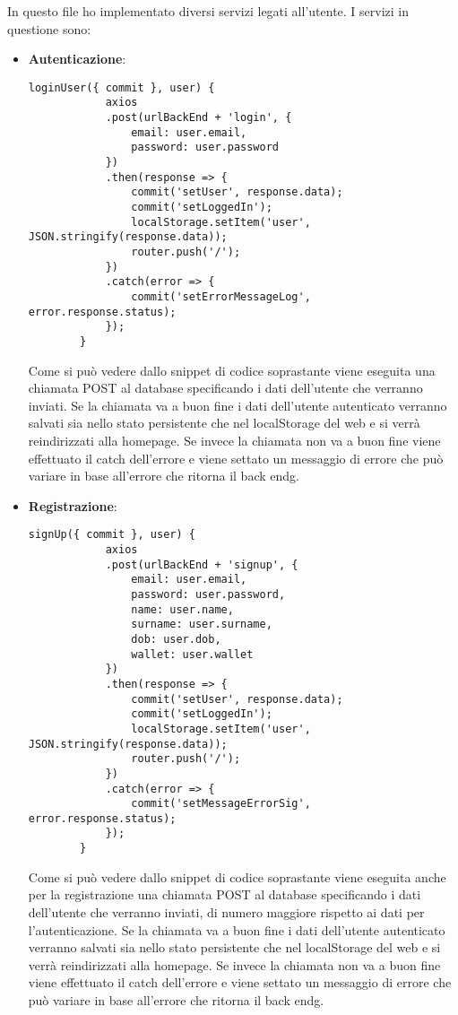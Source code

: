 In questo file ho implementato diversi servizi legati all'utente. I servizi in questione sono:
\begin{itemize}
	\item \textbf{Autenticazione}:
	\begin{lstlisting}[caption=Autententicazione., label=lst::autenticazione]
		loginUser({ commit }, user) {
			axios
			.post(urlBackEnd + 'login', {
				email: user.email,
				password: user.password
			})
			.then(response => {
				commit('setUser', response.data);
				commit('setLoggedIn');
				localStorage.setItem('user', JSON.stringify(response.data));
				router.push('/');
			})
			.catch(error => {
				commit('setErrorMessageLog', error.response.status);
			});
		}
	\end{lstlisting}
	Come si può vedere dallo snippet di codice soprastante viene eseguita una chiamata POST al database specificando i dati dell'utente che verranno inviati. Se la chiamata va a buon fine i dati dell'utente autenticato verranno salvati sia nello stato persistente che nel localStorage del web e si verrà reindirizzati alla homepage. Se invece la chiamata non va a buon fine viene effettuato il catch dell'errore e viene settato un messaggio di errore che può variare in base all'errore che ritorna il \gls{back endg}.
	\item \textbf{Registrazione}:
	\begin{lstlisting}[caption=Registrazione., label=lst::registrazione]
		signUp({ commit }, user) {
			axios
			.post(urlBackEnd + 'signup', {
				email: user.email,
				password: user.password,
				name: user.name,
				surname: user.surname,
				dob: user.dob,
				wallet: user.wallet
			})
			.then(response => {
				commit('setUser', response.data);
				commit('setLoggedIn');
				localStorage.setItem('user', JSON.stringify(response.data));
				router.push('/');
			})
			.catch(error => {
				commit('setMessageErrorSig', error.response.status);
			});
		}
	\end{lstlisting}
	Come si può vedere dallo snippet di codice soprastante viene eseguita anche per la registrazione una chiamata POST al database specificando i dati dell'utente che verranno inviati, di numero maggiore rispetto ai dati per l'autenticazione. Se la chiamata va a buon fine i dati dell'utente autenticato verranno salvati sia nello stato persistente che nel localStorage del web e si verrà reindirizzati alla homepage. Se invece la chiamata non va a buon fine viene effettuato il catch dell'errore e viene settato un messaggio di errore che può variare in base all'errore che ritorna il \gls{back endg}.

\end{itemize}
